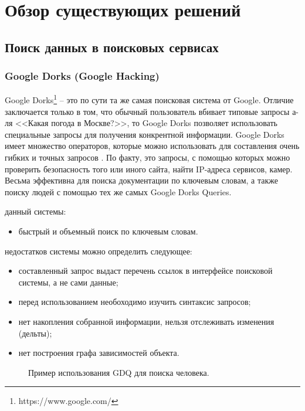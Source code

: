 \section{Обзор существующих решений}
\label{sec:Chapter2} 
\subsection{Поиск данных в поисковых сервисах}
\subsubsection{Google Dorks (Google Hacking)}
Google Dorks\footnote{https://www.google.com/} -- это по сути та же самая поисковая система от Google. Отличие заключается
только в том, что обычный пользователь вбивает типовые запросы а-ля <<Какая погода в Москве?>>, то Google Dorks позволяет
использовать специальные запросы для получения конкрентной информации. Google Dorks имеет множество операторов, которые 
можно использовать для составления очень гибких и точных запросов \cite{googleHackingWikipedia}. По факту, это запросы, с помощью которых можно проверить
безопасность того или иного сайта, найти IP-адреса сервисов, камер. Весьма эффективна для поиска документации по ключевым словам, 
а также поиску людей с помощью тех же самых Google Dorks Queries. 

 данный системы:
\begin{itemize}
    \item быстрый и объемный поиск по ключевым словам.
\end{itemize}

 недостатков системы можно определить следующее:
\begin{itemize}
    \item составленный запрос выдаст перечень ссылок в интерфейсе поисковой системы, а не сами данные;
    \item перед использованием необоходимо изучить синтаксис запросов;
    \item нет накопления собранной информации, нельзя отслеживать изменения (дельты);
    \item нет построения графа зависимостей объекта.
\end{itemize}

\begin{figure}[H]
    \caption{Пример использования GDQ для поиска человека.}
    \label{ris:image}
\end{figure}

